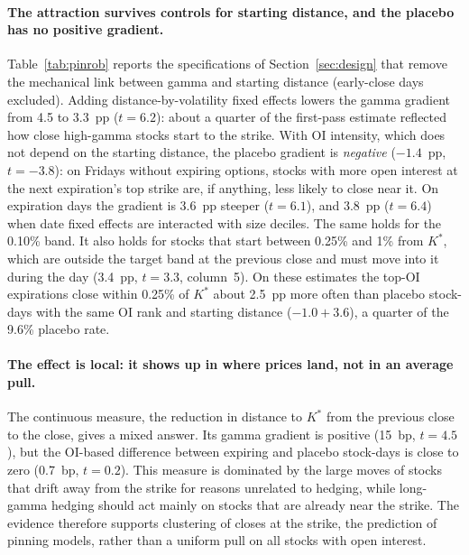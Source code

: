 \documentclass[11pt,a4paper]{article}
\newcommand{\Kstar}{K^{*}}
\begin{document}
\paragraph{The attraction survives controls for starting distance, and the placebo has no positive gradient.} Table~\ref{tab:pinrob} reports the specifications of Section~\ref{sec:design} that remove the mechanical link between gamma and starting distance (early-close days excluded). Adding distance-by-volatility fixed effects lowers the gamma gradient from 4.5 to 3.3~pp ($t=6.2$): about a quarter of the first-pass estimate reflected how close high-gamma stocks start to the strike. With OI intensity, which does not depend on the starting distance, the placebo gradient is \emph{negative} ($-1.4$~pp, $t=-3.8$): on Fridays without expiring options, stocks with more open interest at the next expiration's top strike are, if anything, less likely to close near it. On expiration days the gradient is 3.6~pp steeper ($t=6.1$), and 3.8~pp ($t=6.4$) when date fixed effects are interacted with size deciles. The same holds for the 0.10\% band. It also holds for stocks that start between 0.25\% and 1\% from $\Kstar$, which are outside the target band at the previous close and must move into it during the day (3.4~pp, $t=3.3$, column~5). On these estimates the top-OI expirations close within 0.25\% of $\Kstar$ about 2.5~pp more often than placebo stock-days with the same OI rank and starting distance ($-1.0+3.6$), a quarter of the 9.6\% placebo rate.

\paragraph{The effect is local: it shows up in where prices land, not in an average pull.} The continuous measure, the reduction in distance to $\Kstar$ from the previous close to the close, gives a mixed answer. Its gamma gradient is positive (15~bp, $t=4.5$), but the OI-based difference between expiring and placebo stock-days is close to zero (0.7~bp, $t=0.2$). This measure is dominated by the large moves of stocks that drift away from the strike for reasons unrelated to hedging, while long-gamma hedging should act mainly on stocks that are already near the strike. The evidence therefore supports clustering of closes at the strike, the prediction of pinning models, rather than a uniform pull on all stocks with open interest.
\end{document}
